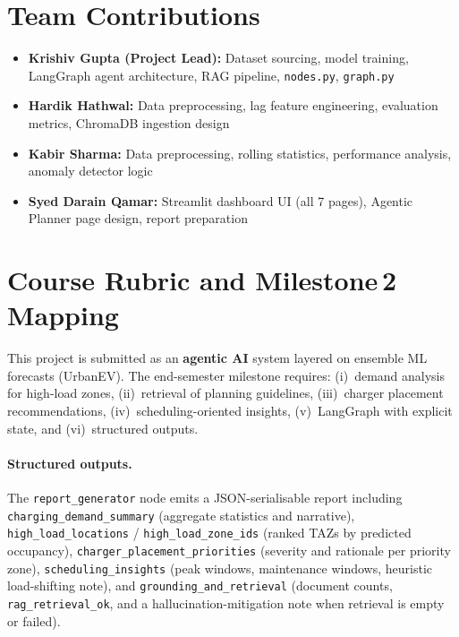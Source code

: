 \documentclass[12pt,a4paper]{article}
\begin{document}
\section{Team Contributions}

\begin{itemize}[leftmargin=*]
  \item \textbf{Krishiv Gupta (Project Lead):} Dataset sourcing, model training,
        LangGraph agent architecture, RAG pipeline, \texttt{nodes.py}, \texttt{graph.py}
  \item \textbf{Hardik Hathwal:} Data preprocessing, lag feature engineering,
        evaluation metrics, ChromaDB ingestion design
  \item \textbf{Kabir Sharma:} Data preprocessing, rolling statistics, performance
        analysis, anomaly detector logic
  \item \textbf{Syed Darain Qamar:} Streamlit dashboard UI (all 7 pages), Agentic
        Planner page design, report preparation
\end{itemize}

\section{Course Rubric and Milestone\,2 Mapping}

This project is submitted as an \textbf{agentic AI} system layered on ensemble ML
forecasts (UrbanEV). The end-semester milestone requires: (i)~demand analysis for
high-load zones, (ii)~retrieval of planning guidelines, (iii)~charger placement
recommendations, (iv)~scheduling-oriented insights, (v)~LangGraph with explicit
state, and (vi)~structured outputs.

\paragraph{Structured outputs.}
The \texttt{report\_generator} node emits a JSON-serialisable report including
\texttt{charging\_demand\_summary} (aggregate statistics and narrative),
\texttt{high\_load\_locations} / \texttt{high\_load\_zone\_ids} (ranked TAZs by
predicted occupancy), \texttt{charger\_placement\_priorities} (severity and
rationale per priority zone), \texttt{scheduling\_insights} (peak windows,
maintenance windows, heuristic load-shifting note), and
\texttt{grounding\_and\_retrieval} (document counts, \texttt{rag\_retrieval\_ok},
and a hallucination-mitigation note when retrieval is empty or failed).
\end{document}
